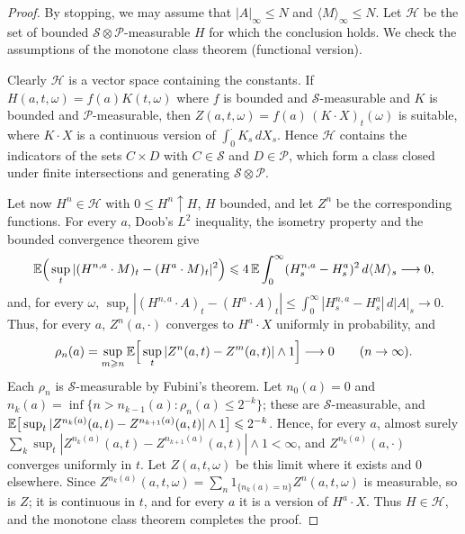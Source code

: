 \begin{proof}
	By stopping, we may assume that $|A|_\infty \leqslant N$ and
	$\langle M\rangle_\infty \leqslant N$. Let $\mathcal{H}$ be the set of bounded
	$\mathcal{S}\otimes \mathcal{P}$-measurable $H$ for which the conclusion
	holds. We check the assumptions of the monotone class theorem (functional
	version).

	Clearly $\mathcal{H}$ is a vector space containing the constants. If
	$H(a,t,\omega)=f(a)K(t,\omega)$ where $f$ is bounded and
	$\mathcal{S}$-measurable and $K$ is bounded and $\mathcal{P}$-measurable, then
	$Z(a,t,\omega) = f(a)\,(K\cdot X)_t(\omega)$ is suitable, where
	$K\cdot X$ is a continuous version of $\int_0^\cdot K_s\,dX_s$. Hence
	$\mathcal{H}$ contains the indicators of the sets $C\times D$ with
	$C\in \mathcal{S}$ and $D\in\mathcal{P}$, which form a class closed under
	finite intersections and generating $\mathcal{S}\otimes\mathcal{P}$.

	Let now $H^n\in\mathcal{H}$ with $0\leqslant H^n \uparrow H$, $H$ bounded,
	and let $Z^n$ be the corresponding functions. For every $a$, Doob's $L^2$
	inequality, the isometry property and the bounded convergence theorem
	give
	\[
		\mathbb{E}\Big( \sup_t |(H^{n,a}\cdot M)_t-(H^{a}\cdot M)_t|^2 \Big)
		\leqslant 4\, \mathbb{E}\int_0^\infty (H^{n,a}_s - H^a_s)^2\, d\langle M \rangle_s
		\longrightarrow 0,
	\]
	and, for every $\omega$,
	$\sup_t |(H^{n,a}\cdot A)_t-(H^{a}\cdot A)_t| \leqslant
		\int_0^\infty |H^{n,a}_s - H^a_s|\,d|A|_s \to 0$. Thus, for every $a$,
	$Z^n(a,\cdot)$ converges to $H^a\cdot X$ uniformly in probability, and
	\[
		\rho_n(a) = \sup_{m \geqslant n}\mathbb{E}\Big[\sup_t |Z^n(a,t)-Z^m(a,t)| \wedge 1\Big]
		\longrightarrow 0 \qquad (n\to\infty).
	\]
	Each $\rho_n$ is $\mathcal{S}$-measurable by Fubini's theorem. Let
	$n_0(a)=0$ and $n_{k}(a) = \inf\{n > n_{k-1}(a) : \rho_n(a) \leqslant 2^{-k}\}$;
	these are $\mathcal{S}$-measurable, and
	$\mathbb{E}\big[\sup_t |Z^{n_k(a)}(a,t)-Z^{n_{k+1}(a)}(a,t)| \wedge 1\big]
		\leqslant 2^{-k}$. Hence, for every $a$, almost surely
	$\sum_k \sup_t |Z^{n_k(a)}(a,t)-Z^{n_{k+1}(a)}(a,t)|\wedge 1 < \infty$, and
	$Z^{n_k(a)}(a,\cdot)$ converges uniformly in $t$. Let $Z(a,t,\omega)$ be this
	limit where it exists and $0$ elsewhere. Since
	$Z^{n_k(a)}(a,t,\omega) = \sum_n 1_{\{n_k(a) = n\}} Z^n(a,t,\omega)$ is measurable,
	so is $Z$; it is continuous in $t$, and for every $a$ it is a version of
	$H^a\cdot X$. Thus $H\in\mathcal{H}$, and the monotone class theorem
	completes the proof.
\end{proof}

